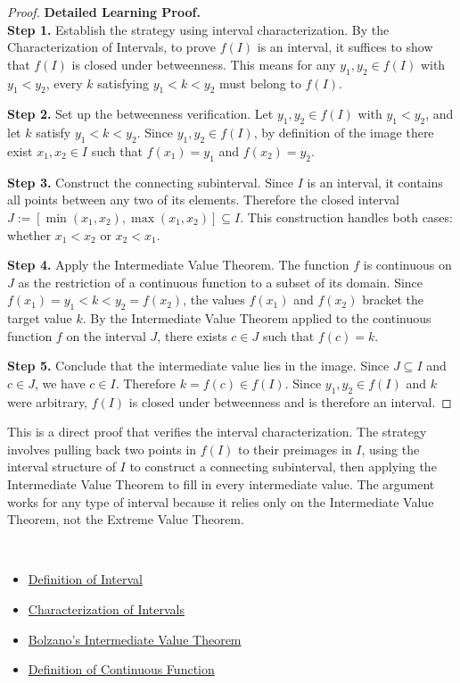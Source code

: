\begin{proof}
\textbf{Detailed Learning Proof.}~\\

\textbf{Step 1.} Establish the strategy using interval characterization.
By the Characterization of Intervals, to prove $f(I)$ is an interval, it suffices to show that $f(I)$ is closed under betweenness. This means for any $y_1, y_2 \in f(I)$ with $y_1 < y_2$, every $k$ satisfying $y_1 < k < y_2$ must belong to $f(I)$.

\textbf{Step 2.} Set up the betweenness verification.
Let $y_1, y_2 \in f(I)$ with $y_1 < y_2$, and let $k$ satisfy $y_1 < k < y_2$. Since $y_1, y_2 \in f(I)$, by definition of the image there exist $x_1, x_2 \in I$ such that $f(x_1) = y_1$ and $f(x_2) = y_2$.

\textbf{Step 3.} Construct the connecting subinterval.
Since $I$ is an interval, it contains all points between any two of its elements. Therefore the closed interval $J := [\min(x_1, x_2), \max(x_1, x_2)] \subseteq I$. This construction handles both cases: whether $x_1 < x_2$ or $x_2 < x_1$.

\textbf{Step 4.} Apply the Intermediate Value Theorem.
The function $f$ is continuous on $J$ as the restriction of a continuous function to a subset of its domain. Since $f(x_1) = y_1 < k < y_2 = f(x_2)$, the values $f(x_1)$ and $f(x_2)$ bracket the target value $k$. By the Intermediate Value Theorem applied to the continuous function $f$ on the interval $J$, there exists $c \in J$ such that $f(c) = k$.

\textbf{Step 5.} Conclude that the intermediate value lies in the image.
Since $J \subseteq I$ and $c \in J$, we have $c \in I$. Therefore $k = f(c) \in f(I)$. Since $y_1, y_2 \in f(I)$ and $k$ were arbitrary, $f(I)$ is closed under betweenness and is therefore an interval.
\end{proof}

\begin{remark*}
This is a direct proof that verifies the interval characterization. The strategy involves pulling back two points in $f(I)$ to their preimages in $I$, using the interval structure of $I$ to construct a connecting subinterval, then applying the Intermediate Value Theorem to fill in every intermediate value. The argument works for any type of interval because it relies only on the Intermediate Value Theorem, not the Extreme Value Theorem.
\end{remark*}

\begin{remark*}[Dependencies]~\\
\begin{itemize}
  \item \hyperref[def:interval]{Definition of Interval}
  \item \hyperref[thm:characterization-of-intervals]{Characterization of Intervals}
  \item \hyperref[thm:bolzano-intermediate-value]{Bolzano's Intermediate Value Theorem}
  \item \hyperref[def:continuous-function]{Definition of Continuous Function}
\end{itemize}
\end{remark*}
